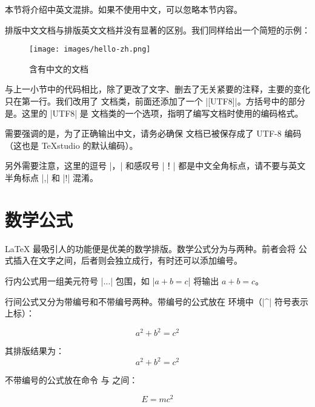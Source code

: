 本节将介绍中英文混排。如果不使用中文，可以忽略本节内容。

排版中文文档与排版英文文档并没有显著的区别。我们同样给出一个简短的示例：


\begin{figure}[htb]
  \texttt{[image: images/hello-zh.png]}
  \caption{含有中文的文档 }
  \label{fig:hello-zh}
\end{figure}

与上一小节中的代码相比，除了更改了文字、删去了无关紧要的注释，主要的变化只在第一行。我们改用了
 文档类，前面还添加了一个 |[UTF8]|。方括号中的部分是。这里的 |UTF8| 是
 文档类的一个选项，指明了编写文档时使用的编码格式。

需要强调的是，为了正确输出中文，请务必确保  文档已被保存成了 UTF-8 编码（这也是
TeXstudio 的默认编码）。

另外需要注意，这里的逗号 |，| 和感叹号 |！| 都是中文全角标点，请不要与英文半角标点 |,| 和 |!| 混淆。

\section{数学公式}

\LaTeX{} 最吸引人的功能便是优美的数学排版。数学公式分为与两种。前者会将
公式插入在文字之间，后者则会独立成行，有时还可以添加编号。

行内公式用一组美元符号 |$...$| 包围，如 |$a+b=c$| 将输出 $a+b=c$。

行间公式又分为带编号和不带编号两种。带编号的公式放在  环境中（|^| 符号表示上标）：

\begin{code}
\begin{equation}
  a^2 + b^2 = c^2
\end{equation}
\end{code}

其排版结果为：
\begin{equation}
  a^2 + b^2 = c^2
\end{equation}

不带编号的公式放在命令 \cs{[} 与 \cs{]}之间：

\begin{code}
\[ E = mc^2 \]
\end{code}

